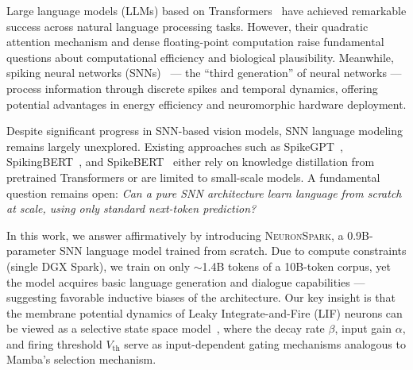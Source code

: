 \documentclass[10pt,twocolumn]{article}
\newcommand{\model}{\textsc{NeuronSpark}}
\newcommand{\vth}{V_{\text{th}}}
\begin{document}
Large language models (LLMs) based on Transformers~\citep{vaswani2017attention} have achieved remarkable success across natural language processing tasks.
However, their quadratic attention mechanism and dense floating-point computation raise fundamental questions about computational efficiency and biological plausibility.
Meanwhile, spiking neural networks (SNNs)~\citep{maass1997networks} --- the ``third generation'' of neural networks --- process information through discrete spikes and temporal dynamics, offering potential advantages in energy efficiency and neuromorphic hardware deployment.

Despite significant progress in SNN-based vision models, SNN language modeling remains largely unexplored.
Existing approaches such as SpikeGPT~\citep{zhu2024spikegpt}, SpikingBERT~\citep{bal2024spikingbert}, and SpikeBERT~\citep{lv2023spikebert} either rely on knowledge distillation from pretrained Transformers or are limited to small-scale models.
A fundamental question remains open: \emph{Can a pure SNN architecture learn language from scratch at scale, using only standard next-token prediction?}

In this work, we answer affirmatively by introducing \model{}, a 0.9B-parameter SNN language model trained from scratch.
Due to compute constraints (single DGX Spark), we train on only $\sim$1.4B tokens of a 10B-token corpus, yet the model acquires basic language generation and dialogue capabilities --- suggesting favorable inductive biases of the architecture.
Our key insight is that the membrane potential dynamics of Leaky Integrate-and-Fire (LIF) neurons can be viewed as a selective state space model~\citep{gu2024mamba}, where the decay rate $\beta$, input gain $\alpha$, and firing threshold $\vth$ serve as input-dependent gating mechanisms analogous to Mamba's selection mechanism.
\end{document}
